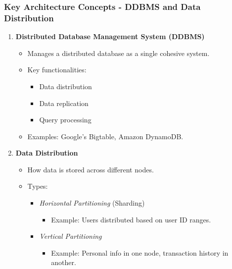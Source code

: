 \documentclass[aspectratio=169]{beamer}
\begin{document}
\begin{frame}[fragile]
  \frametitle{Key Architecture Concepts - DDBMS and Data Distribution}
  \begin{enumerate}
    \item \textbf{Distributed Database Management System (DDBMS)}
      \begin{itemize}
        \item Manages a distributed database as a single cohesive system.
        \item Key functionalities:
          \begin{itemize}
            \item Data distribution
            \item Data replication
            \item Query processing
          \end{itemize}
        \item Examples: Google’s Bigtable, Amazon DynamoDB.
      \end{itemize}
    
    \item \textbf{Data Distribution}
      \begin{itemize}
        \item How data is stored across different nodes.
        \item Types:
          \begin{itemize}
            \item \textit{Horizontal Partitioning} (Sharding)
              \begin{itemize}
                \item Example: Users distributed based on user ID ranges.
              \end{itemize}
            \item \textit{Vertical Partitioning}
              \begin{itemize}
                \item Example: Personal info in one node, transaction history in another.
              \end{itemize}
          \end{itemize}
      \end{itemize}
  \end{enumerate}
\end{frame}
\end{document}
